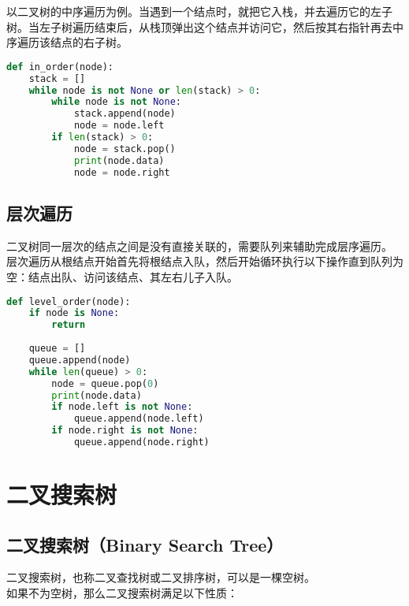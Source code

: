 以二叉树的中序遍历为例。当遇到一个结点时，就把它入栈，并去遍历它的左子树。当左子树遍历结束后，从栈顶弹出这个结点并访问它，然后按其右指针再去中序遍历该结点的右子树。\\


\begin{lstlisting}[language=Python]
def in_order(node):
	stack = []
	while node is not None or len(stack) > 0:
		while node is not None:
			stack.append(node)
			node = node.left
		if len(stack) > 0:
			node = stack.pop()
			print(node.data)
			node = node.right
\end{lstlisting}

\vspace{0.5cm}

\subsection{层次遍历}

二叉树同一层次的结点之间是没有直接关联的，需要队列来辅助完成层序遍历。\\

层次遍历从根结点开始首先将根结点入队，然后开始循环执行以下操作直到队列为空：结点出队、访问该结点、其左右儿子入队。\\


\begin{lstlisting}[language=Python]
def level_order(node):
	if node is None:
		return
	
	queue = []
	queue.append(node)
	while len(queue) > 0:
		node = queue.pop(0)
		print(node.data)
		if node.left is not None:
			queue.append(node.left)
		if node.right is not None:
			queue.append(node.right)
\end{lstlisting}

\newpage

\section{二叉搜索树}

\subsection{二叉搜索树（Binary Search Tree）}

二叉搜索树，也称二叉查找树或二叉排序树，可以是一棵空树。\\

如果不为空树，那么二叉搜索树满足以下性质：

